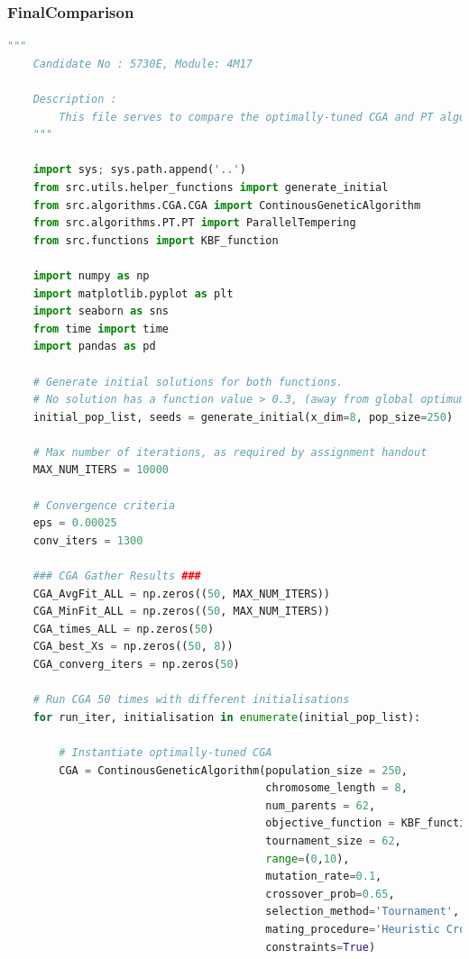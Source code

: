 \documentclass[10pt]{article}
\begin{document}
\subsubsection{FinalComparison}
\label{sec:FinalComparison}
\begin{lstlisting}[language=Python, caption=FinalComparison.py, label=FinalComparisonpy]
    """
    Candidate No : 5730E, Module: 4M17 
    
    Description :
        This file serves to compare the optimally-tuned CGA and PT algorithms in section 5 of the report.                 
    """
    
    import sys; sys.path.append('..')
    from src.utils.helper_functions import generate_initial
    from src.algorithms.CGA.CGA import ContinousGeneticAlgorithm
    from src.algorithms.PT.PT import ParallelTempering
    from src.functions import KBF_function
    
    import numpy as np
    import matplotlib.pyplot as plt
    import seaborn as sns
    from time import time
    import pandas as pd
    
    # Generate initial solutions for both functions. 
    # No solution has a function value > 0.3, (away from global optimum)
    initial_pop_list, seeds = generate_initial(x_dim=8, pop_size=250)
    
    # Max number of iterations, as required by assignment handout
    MAX_NUM_ITERS = 10000
    
    # Convergence criteria
    eps = 0.00025
    conv_iters = 1300 
    
    ### CGA Gather Results ###
    CGA_AvgFit_ALL = np.zeros((50, MAX_NUM_ITERS))
    CGA_MinFit_ALL = np.zeros((50, MAX_NUM_ITERS))
    CGA_times_ALL = np.zeros(50)
    CGA_best_Xs = np.zeros((50, 8))
    CGA_converg_iters = np.zeros(50)
    
    # Run CGA 50 times with different initialisations
    for run_iter, initialisation in enumerate(initial_pop_list):
        
        # Instantiate optimally-tuned CGA
        CGA = ContinousGeneticAlgorithm(population_size = 250, 
                                        chromosome_length = 8, 
                                        num_parents = 62, 
                                        objective_function = KBF_function, 
                                        tournament_size = 62, 
                                        range=(0,10), 
                                        mutation_rate=0.1, 
                                        crossover_prob=0.65, 
                                        selection_method='Tournament', 
                                        mating_procedure='Heuristic Crossover', 
                                        constraints=True)
    

\end{lstlisting}
\end{document}
